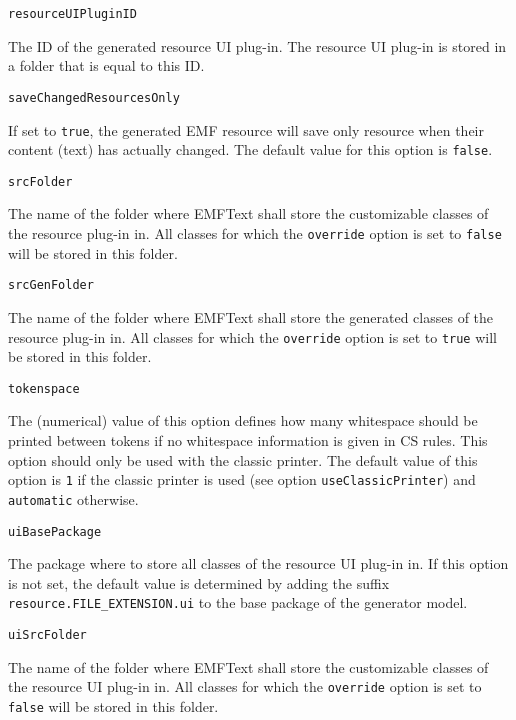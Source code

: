 \noindent\texttt{resourceUIPluginID}
\begin{myindentpar}{1cm}
The ID of the generated resource UI plug-in. The resource UI plug-in is stored in a folder that is equal to this ID.
\end{myindentpar}

\noindent\texttt{saveChangedResourcesOnly}
\begin{myindentpar}{1cm}
If set to \texttt{true}, the generated EMF resource will save only resource when their content (text) has actually changed. The default value for this option is \texttt{false}.
\end{myindentpar}

\noindent\texttt{srcFolder}
\begin{myindentpar}{1cm}
The name of the folder where EMFText shall store the customizable classes of the resource plug-in in. All classes for which the \texttt{override} option is set to \texttt{false} will be stored in this folder.
\end{myindentpar}

\noindent\texttt{srcGenFolder}
\begin{myindentpar}{1cm}
The name of the folder where EMFText shall store the generated classes of the resource plug-in in. All classes for which the \texttt{override} option is set to \texttt{true} will be stored in this folder.
\end{myindentpar}

\noindent\texttt{tokenspace}
\begin{myindentpar}{1cm}
The (numerical) value of this option defines how many whitespace should be printed between tokens if no whitespace information is given in CS rules. This option should only be used with the classic printer. The default value of this option is \texttt{1} if the classic printer is used (see option \texttt{useClassicPrinter}) and \texttt{automatic} otherwise.
\end{myindentpar}

\noindent\texttt{uiBasePackage}
\begin{myindentpar}{1cm}
The package where to store all classes of the resource UI plug-in in. If this option is not set, the default value is determined by adding the suffix \texttt{resource.FILE\_EXTENSION.ui} to the base package of the generator model.
\end{myindentpar}

\noindent\texttt{uiSrcFolder}
\begin{myindentpar}{1cm}
The name of the folder where EMFText shall store the customizable classes of the resource UI plug-in in. All classes for which the \texttt{override} option is set to \texttt{false} will be stored in this folder.
\end{myindentpar}

